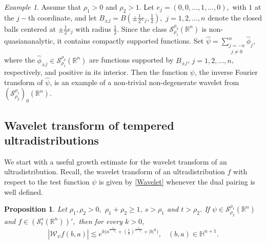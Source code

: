 \documentclass[reqno,12pt]{amsart}
\theoremstyle{plain}
\newtheorem{proposition}{Proposition}
\theoremstyle{definition}
\theoremstyle{remark}
\newtheorem{example}{Example}
\begin{document}
\begin{example} Assume that $ \rho_1 > 0$ and $ \rho_2 > 1$.
Let $e_j = (0,0,\dots,1,\dots,0), $ with $1$ at the $j-$th
coordinate, and let $ B_{\pm j} = B (\pm
\frac{1}{2} e_j, \frac{1}{2}), $ $ j = 1,2,\dots,n$ denote the closed
balls centered at $ \pm \frac{1}{2} e_j$ with radius $\frac{1}{2} $. Since the class $\mathcal{S}^{\rho_{2}}_{\rho_1}(\mathbb{R}^{n})$ is non-quasiananalytic, it contains compactly supported functions. Set $ \hat \psi=\underset{j\neq 0}{\sum_{j=-n}^{n}  \hat
\phi_{j}}$, where the $ \hat \phi_{\pm j}\in \mathcal{S}^{\rho_{2}}_{\rho_1}(\mathbb{R}^{n})$ are
functions supported by $B_{\pm j} $, $ j = 1,2,\dots,n$,
respectively, and positive in its interior. Then the function $\psi$, the inverse Fourier transform of $\hat \psi$, is an example of
a non-trivial non-degenerate wavelet from $ ({\mathcal S}^{\rho_1}_{\rho_2})_0
(\mathbb{R}^n)$.
\end{example}

\par

\subsection{Wavelet transform of tempered ultradistributions}
We start with a useful growth estimate for the wavelet
transform of an ultradistribution. Recall, the wavelet transform of
an  ultradistribution $f$ with respect to the test function $ \psi $ is
given by \eqref{Wavelet} whenever the dual pairing  is well defined.

\par

\begin{proposition} \label{Calderon 2}
Let $ {\rho_1}, {\rho_2} >0, $ $ {\rho_1} + {\rho_2} \geq 1$, $ s> {\rho_1}$ and $ t>{\rho_2}$.
If $ \psi \in {\mathcal S}^{{\rho_1}}_{{\rho_2}} (\mathbb{R}^n) $ and $ f \in
({\mathcal S}^s_t (\mathbb{R}^n))', $ then for  every $ k > 0$,
$$
|{\mathcal W}_{\psi} f(b, a)| \lesssim
 e^{k \big( a^{\frac{1}{t - {\rho_2}}} + (\frac{1}{a})^{\frac{1}{s - {\rho_1}}}
+ |b|^{\frac{1}{t}}  \big)}, \;\;\; (b,a) \in \mathbb{H}^{n+1}.
$$

\end{proposition}
\end{document}
